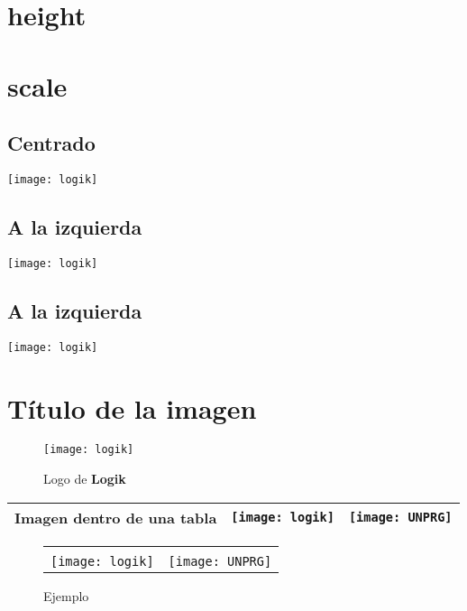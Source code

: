 \documentclass[11pt,a4paper]{article}
\begin{document}
\section{height}

\section{scale}
\subsection{Centrado}
\begin{center}
\texttt{[image: logik]}
\end{center}


\subsection{A la izquierda}
\begin{flushleft}
\texttt{[image: logik]}
\end{flushleft}


\subsection{A la izquierda}
\begin{flushright}
\texttt{[image: logik]}
\end{flushright}

\section{Título de la imagen}

\begin{figure}[h]
\begin{center}
\texttt{[image: logik]}
\caption{Logo de {\bf Logik}}
\end{center}
\end{figure}

\begin{tabular}{c|c|c}
\hline 
Imagen dentro de una tabla & \texttt{[image: logik]} & \texttt{[image: UNPRG]}\\ [0.5cm]\hline
\end{tabular}

\begin{figure}[h!]
\begin{center}
\begin{tabular}{|c|c|}
\hline \\ [0.2cm]
\texttt{[image: logik]} & \texttt{[image: UNPRG]} \\  \hline 
\end{tabular}
\caption{Ejemplo}
\end{center}
\end{figure}
\end{document}
